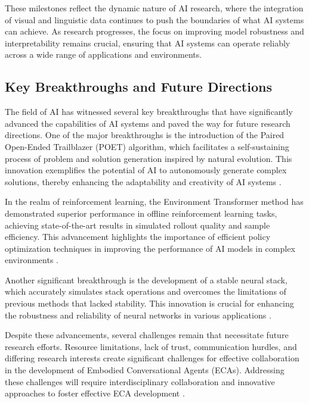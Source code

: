 These milestones reflect the dynamic nature of AI research, where the integration of visual and linguistic data continues to push the boundaries of what AI systems can achieve. As research progresses, the focus on improving model robustness and interpretability remains crucial, ensuring that AI systems can operate reliably across a wide range of applications and environments.



\subsection{Key Breakthroughs and Future Directions} \label{subsec:Key Breakthroughs and Future Directions}



The field of AI has witnessed several key breakthroughs that have significantly advanced the capabilities of AI systems and paved the way for future research directions. One of the major breakthroughs is the introduction of the Paired Open-Ended Trailblazer (POET) algorithm, which facilitates a self-sustaining process of problem and solution generation inspired by natural evolution. This innovation exemplifies the potential of AI to autonomously generate complex solutions, thereby enhancing the adaptability and creativity of AI systems \cite{wang2019pairedopenendedtrailblazerpoet}.



In the realm of reinforcement learning, the Environment Transformer method has demonstrated superior performance in offline reinforcement learning tasks, achieving state-of-the-art results in simulated rollout quality and sample efficiency. This advancement highlights the importance of efficient policy optimization techniques in improving the performance of AI models in complex environments \cite{wang2023environmenttransformerpolicyoptimization}.



Another significant breakthrough is the development of a stable neural stack, which accurately simulates stack operations and overcomes the limitations of previous methods that lacked stability. This innovation is crucial for enhancing the robustness and reliability of neural networks in various applications \cite{stogin2022provablystableneuralnetwork}.



Despite these advancements, several challenges remain that necessitate future research efforts. Resource limitations, lack of trust, communication hurdles, and differing research interests create significant challenges for effective collaboration in the development of Embodied Conversational Agents (ECAs). Addressing these challenges will require interdisciplinary collaboration and innovative approaches to foster effective ECA development \cite{korre2023takesvillagemultidisciplinaritycollaboration}.



